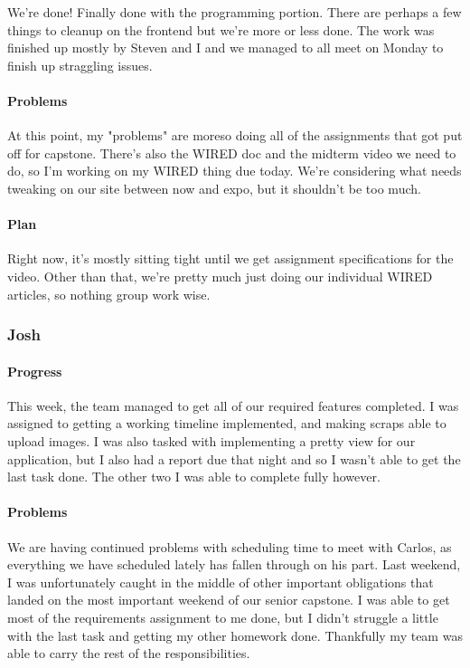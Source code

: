 \documentclass[onecolumn, draftclsnofoot,10pt, compsoc]{IEEEtran}
\begin{document}
	We're done! Finally done with the programming portion. There are perhaps a few things to cleanup on the frontend but we're more or less done. The work was finished up mostly by Steven and I and we managed to all meet on Monday to finish up straggling issues.
	
	\paragraph{Problems}
	
	At this point, my "problems" are moreso doing all of the assignments that got put off for capstone. There's also the WIRED doc and the midterm video we need to do, so I'm working on my WIRED thing due today. We're considering what needs tweaking on our site between now and expo, but it shouldn't be too much. 
	
	\paragraph{Plan}
	
	Right now, it's mostly sitting tight until we get assignment specifications for the video. Other than that, we're pretty much just doing our individual WIRED articles, so nothing group work wise.
	
	\subsubsection{Josh}
	
	\paragraph{Progress}
	This week, the team managed to get all of our required features completed. I was assigned to getting a working timeline implemented, and making scraps able to upload images. I was also tasked with implementing a pretty view for our application, but I also had a report due that night and so I wasn't able to get the last task done. The other two I was able to complete fully however. 
	
	\paragraph{Problems}
	We are having continued problems with scheduling time to meet with Carlos, as everything we have scheduled lately has fallen through on his part. Last weekend, I was unfortunately caught in the middle of other important obligations that landed on the most important weekend of our senior capstone. I was able to get most of the requirements assignment to me done, but I didn't struggle a little with the last task and getting my other homework done. Thankfully my team was able to carry the rest of the responsibilities. 
	
\end{document}
